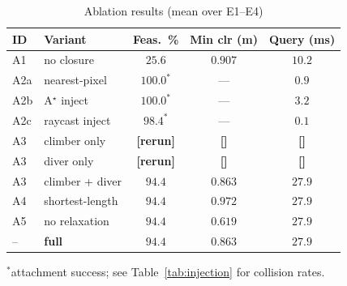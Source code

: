 \documentclass[conference]{IEEEtran}
\newcommand{\PH}[1]{{\color{red}\textbf{[#1]}}}
\begin{document}
\begin{table}[htbp]
\caption{Ablation results (mean over E1--E4)}
\label{tab:ablation}
\begin{center}
\begin{tabular}{@{}llccc@{}}
\toprule
\textbf{ID} & \textbf{Variant} & \textbf{Feas.\ \%} & \textbf{Min clr (m)} & \textbf{Query (ms)} \\ \midrule
A1 & no closure & $25.6$ & $0.907$ & $10.2$ \\
A2a & nearest-pixel & $100.0^{\ast}$ & --- & $0.9$ \\
A2b & A$^\star$ inject & $100.0^{\ast}$ & --- & $3.2$ \\
A2c & raycast inject & $98.4^{\ast}$ & --- & $0.1$ \\
A3 & climber only & \PH{rerun} & \PH{} & \PH{} \\
A3 & diver only & \PH{rerun} & \PH{} & \PH{} \\
A3 & climber + diver & $\mathbf{94.4}$ & $0.863$ & $27.9$ \\
A4 & shortest-length & $94.4$ & $0.972$ & $27.9$ \\
A5 & no relaxation & $94.4$ & $0.619$ & $27.9$ \\
-- & \textbf{full} & $\mathbf{94.4}$ & $0.863$ & $27.9$ \\ \bottomrule
\end{tabular}
\end{center}
\footnotesize $^{\ast}$attachment success; see Table~\ref{tab:injection} for collision rates.
\end{table}
\end{document}
